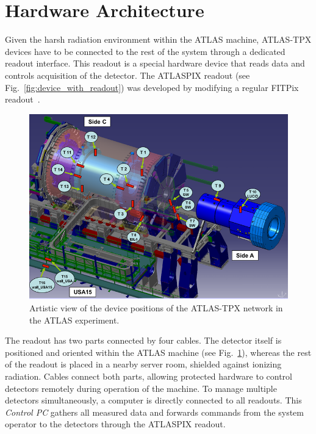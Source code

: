

\section{\label{sec:hardware}Hardware Architecture}
Given the harsh radiation environment within the ATLAS machine, ATLAS-TPX devices have to be connected to the rest of the system through a dedicated readout interface. This readout is a special hardware device that reads data and controls acquisition of the detector. The ATLASPIX readout (see Fig.~\ref{fig:device_with_readout}) was developed by modifying a regular FITPix readout~\cite{FITPix}.

\begin{figure}[tbp]
	\centering
  \includegraphics[clip, width=.45\textwidth, angle=0]{Plots/ATLASTPX.png}
  \caption {Artistic view of the device positions of the ATLAS-TPX network in the ATLAS experiment.}
  \label{fig:positions}
\end{figure}

The readout has two parts connected by four cables. The detector itself is positioned and oriented within the ATLAS machine (see Fig.~\ref{fig:positions}), whereas the rest of the readout is placed in a nearby server room, shielded against ionizing radiation. Cables connect both parts, allowing protected hardware to control detectors remotely during operation of the machine. To manage multiple detectors simultaneously, a computer is directly connected to all readouts. This \textit{Control PC} gathers all measured data and forwards commands from the system operator to the detectors through the ATLASPIX readout.


